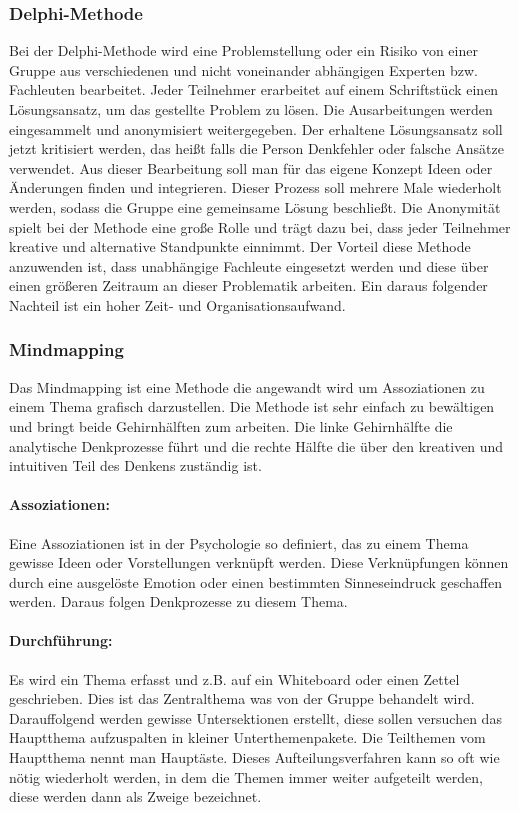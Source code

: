 \subsubsection{Delphi-Methode}
Bei der Delphi-Methode wird eine Problemstellung oder ein Risiko von einer Gruppe aus verschiedenen und nicht voneinander abhängigen Experten bzw. Fachleuten bearbeitet. 
Jeder Teilnehmer erarbeitet auf einem Schriftstück einen Lösungsansatz, um das gestellte Problem zu lösen.
Die Ausarbeitungen werden eingesammelt und anonymisiert weitergegeben.
Der erhaltene Lösungsansatz soll jetzt kritisiert werden, das heißt falls die Person Denkfehler oder falsche Ansätze verwendet. Aus dieser Bearbeitung soll man für das eigene Konzept Ideen oder Änderungen finden und integrieren.
Dieser Prozess soll mehrere Male wiederholt werden, sodass die Gruppe eine gemeinsame Lösung beschließt.
Die Anonymität spielt bei der Methode eine große Rolle und trägt dazu bei, dass jeder Teilnehmer kreative und alternative Standpunkte einnimmt.
Der Vorteil diese Methode anzuwenden ist, dass unabhängige Fachleute eingesetzt werden und diese über einen größeren Zeitraum an dieser Problematik arbeiten.
Ein daraus folgender Nachteil ist ein hoher Zeit- und Organisationsaufwand.

\subsubsection{Mindmapping}
Das Mindmapping ist eine Methode die angewandt wird um Assoziationen zu einem Thema grafisch darzustellen.
Die Methode ist sehr einfach zu bewältigen und bringt beide Gehirnhälften zum arbeiten. Die linke Gehirnhälfte die analytische Denkprozesse führt und die rechte Hälfte die über den kreativen und intuitiven Teil des Denkens zuständig ist.
\\
\paragraph{Assoziationen:} 
Eine Assoziationen ist in der Psychologie so definiert, das zu einem Thema gewisse Ideen oder Vorstellungen verknüpft werden. Diese Verknüpfungen können durch eine ausgelöste Emotion oder einen bestimmten Sinneseindruck geschaffen werden. Daraus folgen Denkprozesse zu diesem Thema. 

\paragraph{Durchführung:}
Es wird ein Thema erfasst und z.B. auf ein Whiteboard oder einen Zettel geschrieben. Dies ist das Zentralthema was von der Gruppe behandelt wird.
Darauffolgend werden gewisse Untersektionen erstellt, diese sollen versuchen das Hauptthema aufzuspalten in kleiner Unterthemenpakete.
Die Teilthemen vom Hauptthema nennt man Hauptäste.
Dieses Aufteilungsverfahren kann so oft wie nötig wiederholt werden, in dem die Themen immer weiter aufgeteilt werden, diese werden dann als Zweige bezeichnet.

